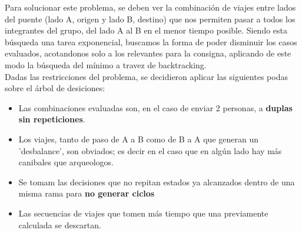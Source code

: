 Para solucionar este problema, se deben ver la combinaci\'on de viajes entre lados del puente (lado A, origen y lado B, destino) que nos permiten pasar a todos los integrantes
del grupo, del lado A al B en el menor tiempo posible. Siendo esta b\'usqueda una tarea exponencial, buscamos la forma de poder disminuir los casos evaluados, acotandonos solo a los relevantes
para la consigna, aplicando de este modo la b\'usqueda del m\'inimo a travez de backtracking.\\

Dadas las restricciones del problema, se decidieron aplicar las siguientes podas sobre el árbol de desiciones:
\begin{itemize}
	\item Las combinaciones evaluadas son, en el caso de enviar 2 personas, a {\bf duplas sin repeticiones}.
	\item Los viajes, tanto de paso de A a B como de B a A que generan un 'desbalance', son obviados; es decir en el caso que en alg\'un lado hay más canibales que arqueologos.
	
	\item Se tomam las decisiones que no repitan estados ya alcanzados dentro de una misma rama para {\bf no generar  ciclos}
	\item Las secuencias de viajes que tomen más tiempo que una previamente calculada se descartan.
\end{itemize}

